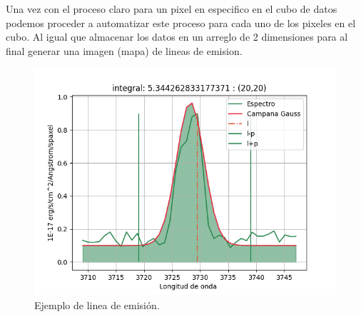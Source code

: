 \documentclass[9pt,twocolumn,a4paper]{opticajnl}
\begin{document}
Una vez con el proceso claro para un pixel en especifico en el cubo de datos podemos proceder a automatizar este proceso para cada uno de los pixeles en el cubo. Al igual que almacenar los datos en un arreglo de 2 dimensiones para al final generar una imagen (mapa) de lineas de emision.

\begin{figure}
    \centering
    \includegraphics[width=1\linewidth]{extraccion_linea.png}
    \caption{Ejemplo de linea de emisión.}
    \label{fig:moreinfo}
\end{figure}

\newpage
\end{document}

